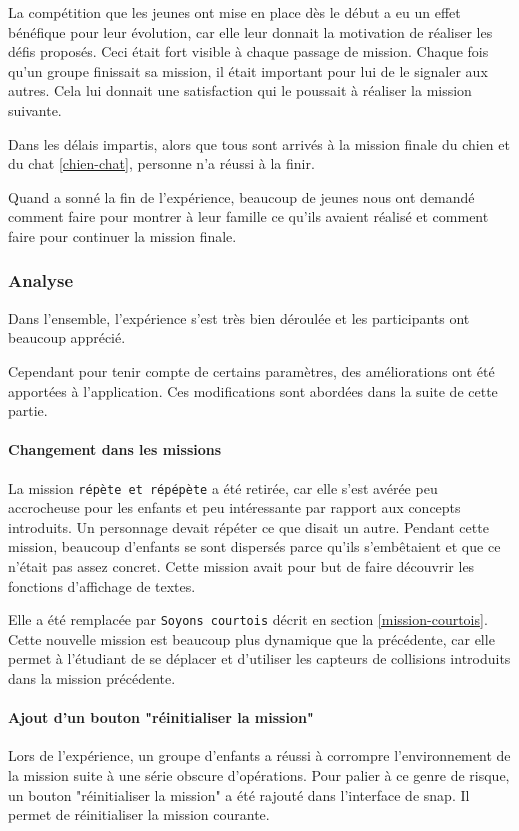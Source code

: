 La compétition que les jeunes ont mise en place dès le début a eu un effet bénéfique pour leur évolution, car elle leur donnait la motivation de réaliser les défis proposés. Ceci était fort visible à chaque passage de \gls{mission}. Chaque fois qu'un groupe finissait sa \gls{mission}, il était important pour lui de le signaler aux autres. Cela lui donnait une satisfaction qui le poussait à réaliser la \gls{mission} suivante.

Dans les délais impartis, alors que tous sont arrivés à la \gls{mission} finale du chien et du chat \ref{chien-chat}, personne n'a réussi à la finir.

Quand a sonné la fin de l'expérience, beaucoup de jeunes nous ont demandé comment faire pour montrer à leur famille ce qu'ils avaient réalisé et comment faire pour continuer la \gls{mission} finale.

\subsubsection{Analyse}
\label{analyse-kidscode}
Dans l'ensemble, l'expérience s'est très bien déroulée et les participants ont beaucoup apprécié.

Cependant pour tenir compte de certains paramètres, des améliorations ont été apportées à l'application. Ces modifications sont abordées dans la suite de cette partie.

\paragraph{Changement dans les missions}
La \gls{mission} \texttt{répète et répépète} a été retirée, car elle s'est avérée peu accrocheuse pour les enfants et peu intéressante par rapport aux concepts introduits. Un personnage devait répéter ce que disait un autre. Pendant cette \gls{mission}, beaucoup d'enfants se sont dispersés parce qu'ils s'embêtaient et que ce n'était pas assez concret. Cette \gls{mission} avait pour but de faire découvrir les fonctions d'affichage de textes.

Elle a été remplacée par \texttt{Soyons courtois} décrit en section \ref{mission-courtois}. Cette nouvelle \gls{mission} est beaucoup plus dynamique que la précédente, car elle permet à l'étudiant de se déplacer et d'utiliser les capteurs de collisions introduits dans la \gls{mission} précédente.

\paragraph{Ajout d'un bouton "réinitialiser la mission"}
Lors de l'expérience, un groupe d'enfants a réussi à corrompre l'environnement de la \gls{mission} suite à une série obscure d'opérations. Pour palier à ce genre de risque, un bouton "réinitialiser la mission" a été rajouté dans l'interface de \gls{snap}. Il permet de réinitialiser la \gls{mission} courante.

